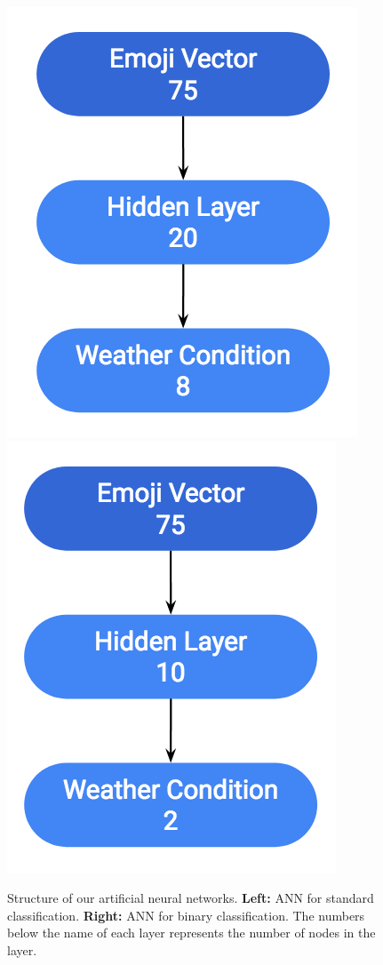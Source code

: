 \documentclass[12pt]{article}
\begin{document}
\begin{figure}[h]
\includegraphics[scale=0.7]{neuralnet}
\includegraphics[scale=0.7]{neuralnetbinary}
\centering
\caption{Structure of our artificial neural networks. \textbf{Left:} ANN for standard classification. \textbf{Right:} ANN for binary classification. The numbers below the name of each layer represents the number of nodes in the layer.}
\label{fig:neuralnet}
\end{figure}
\end{document}
